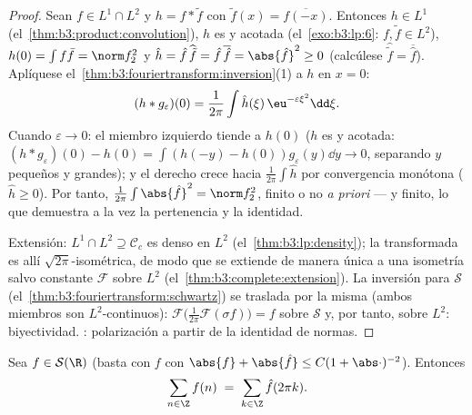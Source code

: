 \begin{proof}
Sean $f \in L^1\cap L^2$ y $h = f * \tilde f$ con
$\tilde f(x) = \overline{f(-x)}$. Entonces $h \in L^1$
(el~\cref{thm:b3:product:convolution}), $h$ es
 y acotada
(el~\cref{exo:b3:lp:6}: $f, \tilde f \in L^2$), $h(0) =
\int f\bar f = \norm f_2^2$ y $\hat h = \hat
f\,\widehat{\tilde f} = \hat f\,\overline{\hat f} =
\abs{\hat f}^2 \geq 0$ (calcúlese $\widehat{\tilde f} =
\overline{\hat f}$). Aplíquese
el~\cref{thm:b3:fouriertransform:inversion}(1) a $h$ en $x = 0$:
\[
(h * g_\varepsilon)(0) = \frac1{2\pi}\int \hat
h(\xi)\,\eu^{-\varepsilon\xi^2}\dd\xi .
\]
Cuando $\varepsilon \to 0$: el miembro izquierdo tiende a $h(0)$ ($h$ es
 y acotada:
$(h*g_\varepsilon)(0) - h(0) = \int(h(-y)
- h(0))g_\varepsilon(y)\dd y \to 0$, separando $y$ pequeños y grandes);
y el derecho crece hacia $\frac1{2\pi}\int\hat h$ por convergencia
monótona ($\hat h \geq 0$). Por tanto, $\frac1{2\pi}\int\abs{\hat f}^2 =
\norm f_2^2$, finito o no \emph{a priori} --- y finito, lo que demuestra
a la vez la pertenencia y la identidad.

Extensión: $L^1\cap L^2 \supseteq \mathcal C_c$ es denso en $L^2$
(el~\cref{thm:b3:lp:density}); la transformada es allí
$\sqrt{2\pi}$-isométrica, de modo que se extiende de manera única a una
isometría salvo constante $\mathcal F$ sobre $L^2$
(el~\cref{thm:b3:complete:extension}). La inversión para $\mathcal S$
(el~\cref{thm:b3:fouriertransform:schwartz}) se traslada por la misma
 (ambos miembros son
$L^2$-continuos): $\mathcal
F\bigl(\frac1{2\pi}\mathcal F(\sigma f)\bigr) = f$ sobre $\mathcal S$ y,
por tanto, sobre $L^2$: biyectividad.
: polarización a
partir de la identidad de normas.
\end{proof}

\begin{theorem}
\label{thm:b3:fouriertransform:poisson}
Sea $f \in \mathcal S(\R)$ (basta con $f$
 con $\abs{f} +
\abs{\hat f} \leq C(1 + \abs\cdot)^{-2}$). Entonces
\[
\sum_{n\in\Z} f(n) \;=\; \sum_{k\in\Z}\hat f(2\pi k) .
\]
\end{theorem}

